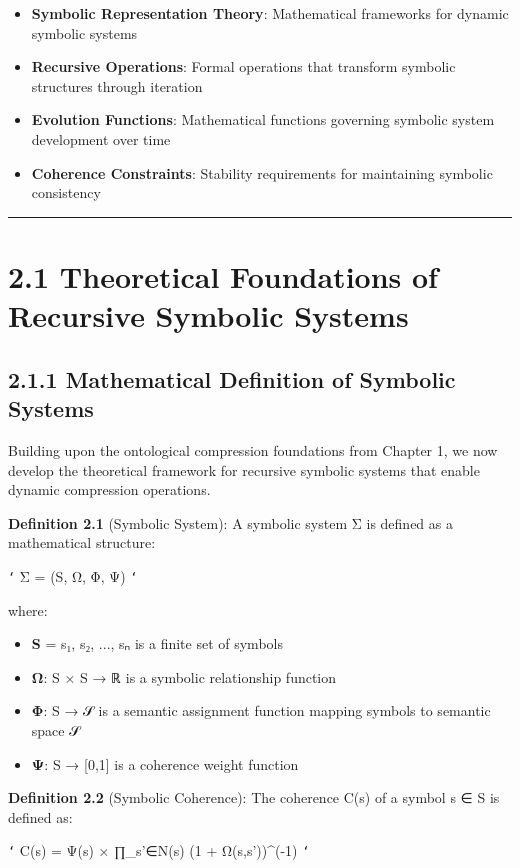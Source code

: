 \begin{itemize}
\item \textbf{Symbolic Representation Theory}: Mathematical frameworks for dynamic symbolic systems
\item \textbf{Recursive Operations}: Formal operations that transform symbolic structures through iteration
\item \textbf{Evolution Functions}: Mathematical functions governing symbolic system development over time
\item \textbf{Coherence Constraints}: Stability requirements for maintaining symbolic consistency
\end{itemize}

\hrule

\section{2.1 Theoretical Foundations of Recursive Symbolic Systems}

\subsection{2.1.1 Mathematical Definition of Symbolic Systems}

Building upon the ontological compression foundations from Chapter 1, we now develop the theoretical framework for recursive symbolic systems that enable dynamic compression operations.

\textbf{Definition 2.1} (Symbolic System): A symbolic system Σ is defined as a mathematical structure:

\texttt{`}
Σ = (S, Ω, Φ, Ψ)
\texttt{`}

where:
\begin{itemize}
\item \textbf{S} = {s₁, s₂, ..., sₙ} is a finite set of symbols
\item \textbf{Ω}: S × S → ℝ is a symbolic relationship function
\item \textbf{Φ}: S → 𝒮 is a semantic assignment function mapping symbols to semantic space 𝒮
\item \textbf{Ψ}: S → [0,1] is a coherence weight function
\end{itemize}

\textbf{Definition 2.2} (Symbolic Coherence): The coherence C(s) of a symbol s ∈ S is defined as:

\texttt{`}
C(s) = Ψ(s) × ∏_{s'∈N(s)} (1 + Ω(s,s'))^(-1)
\texttt{`}

